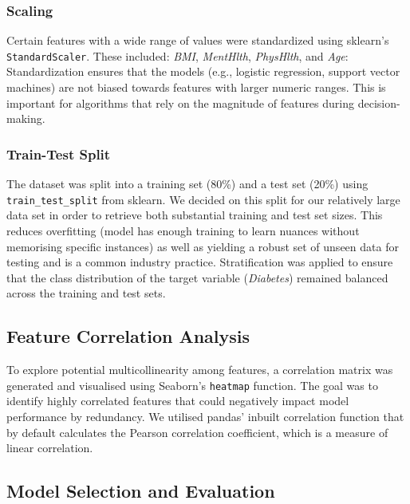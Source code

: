 \documentclass[a4paper,12pt]{article}
\begin{document}
\subsubsection{Scaling}
Certain features with a wide range of values were standardized using sklearn's \texttt{StandardScaler}. These included:
\textit{BMI}, \textit{MentHlth}, \textit{PhysHlth}, and \textit{Age}: Standardization ensures that the models 
(e.g., logistic regression, support vector machines) are not biased towards features with larger 
numeric ranges. This is important for algorithms that rely on the magnitude of features during 
decision-making.

\subsubsection{Train-Test Split}
The dataset was split into a training set (80\%) and a test set (20\%) using \texttt{train\_test\_split} from 
sklearn. We decided on this split for our relatively large data set in order to retrieve both substantial 
training and test set sizes. This reduces overfitting (model has enough training to learn nuances without 
memorising specific instances) as well as yielding a robust set of unseen data for testing and is a common industry practice. 
Stratification was applied to ensure that the class distribution of the target variable 
(\textit{Diabetes}) remained balanced across the training and test sets.

\subsection{Feature Correlation Analysis}
To explore potential multicollinearity among features, a correlation matrix was generated and
visualised using Seaborn's \texttt{heatmap} function. The goal was to identify highly correlated features 
that could negatively impact model performance by redundancy. We utilised pandas' inbuilt correlation
function that by default calculates the Pearson correlation coefficient, which is a measure of linear correlation.

\subsection{Model Selection and Evaluation}
\end{document}
